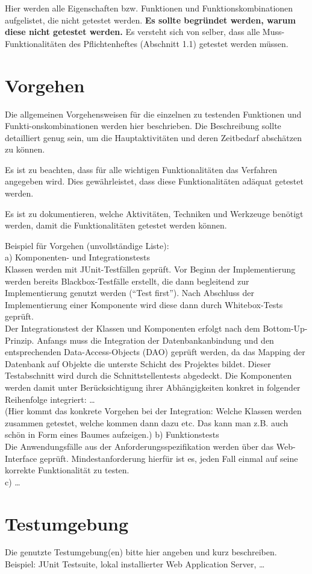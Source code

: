 Hier werden alle Eigenschaften bzw. Funktionen und Funktionskombinationen
aufgelistet, die nicht getestet werden.
\textbf{ Es sollte begründet werden, warum diese nicht getestet werden.} Es
versteht sich von selber, dass alle Muss-Funktionalitäten des Pflichtenheftes
(Abschnitt 1.1) getestet werden müssen.

\section{Vorgehen}
Die allgemeinen Vorgehensweisen für die einzelnen zu testenden Funktionen und
Funkti-onskombinationen werden hier beschrieben. Die Beschreibung sollte
detailliert genug sein, um die Hauptaktivitäten und deren Zeitbedarf abschätzen
zu können.

Es ist zu beachten, dass für alle wichtigen Funktionalitäten das Verfahren
angegeben wird. Dies gewährleistet, dass diese Funktionalitäten adäquat
getestet werden.

Es ist zu dokumentieren, welche Aktivitäten, Techniken und Werkzeuge benötigt
werden, damit die Funktionalitäten getestet werden können.

Beispiel für Vorgehen (unvollständige Liste):\\
a) Komponenten- und Integrationstests\\
Klassen werden mit JUnit-Testfällen geprüft. Vor Beginn der Implementierung
werden bereits Blackbox-Testfälle erstellt, die dann begleitend zur
Implementierung genutzt werden ("`Test first"'). Nach Abschluss der
Implementierung einer Komponente wird diese dann durch Whitebox-Tests
geprüft.\\
Der Integrationstest der Klassen und Komponenten erfolgt nach dem
Bottom-Up-Prinzip. Anfangs muss die Integration der Datenbankanbindung und den
entsprechenden Data-Access-Objects (DAO) geprüft werden, da das Mapping der
Datenbank auf Objekte die unterste Schicht des Projektes bildet. Dieser
Testabschnitt wird durch die Schnittstellentests abgedeckt.
Die Komponenten werden damit unter Berücksichtigung ihrer Abhängigkeiten
konkret in folgender Reihenfolge integriert: \ldots\\
(Hier kommt das konkrete Vorgehen bei der Integration: Welche Klassen werden
zusammen getestet, welche kommen dann dazu etc. Das kann man z.B. auch schön in
Form eines Baumes aufzeigen.)
b) Funktionstests\\
Die Anwendungsfälle aus der Anforderungsspezifikation werden über das
Web-Interface geprüft. Mindestanforderung hierfür ist es, jeden Fall einmal auf
seine korrekte Funktionalität zu testen.\\
c) \ldots

\section{Testumgebung}
Die genutzte Testumgebung(en) bitte hier angeben und kurz beschreiben.\\
Beispiel: JUnit Testsuite, lokal installierter Web Application Server, \ldots

